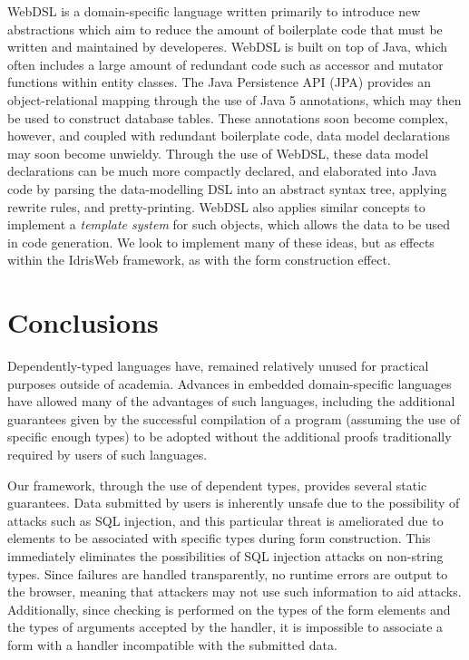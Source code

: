 \documentclass[preprint]{sigplanconf}
\begin{document}
WebDSL \cite{webdsl} is a domain-specific language written primarily to
introduce new abstractions which aim to reduce the amount of boilerplate code
that must be written and maintained by developeres. WebDSL is built on top of
Java, which often includes a large amount of redundant code such as accessor
and mutator functions within entity classes. The Java Persistence API (JPA)
\cite{jpa} provides an object-relational mapping through the use of Java 5
annotations, which may then be used to construct database tables. These
annotations soon become complex, however, and coupled with redundant
boilerplate code, data model declarations may soon become unwieldy. Through the
use of WebDSL, these data model declarations can be much more compactly
declared, and elaborated into Java code by parsing the data-modelling DSL into
an abstract syntax tree, applying rewrite rules, and pretty-printing. WebDSL
also applies similar concepts to implement a \textit{template system} for such
objects, which allows the data to be used in code generation. We look to
implement many of these ideas, but as effects within the IdrisWeb
framework, as with the form construction effect.


\section{Conclusions}
Dependently-typed languages have, remained relatively unused for practical purposes outside of academia. Advances in embedded domain-specific languages have allowed many of the advantages of such languages, including the additional guarantees given by the successful compilation of a program (assuming the use of specific enough types) to be adopted without the additional proofs traditionally required by users of such languages.

Our framework, through the use of dependent types, provides several static guarantees. Data submitted by users is inherently unsafe due to the possibility of attacks such as SQL injection, and this particular threat is ameliorated due to elements to be associated with specific types during form construction. This immediately eliminates the possibilities of SQL injection attacks on non-string types. Since failures are handled transparently, no runtime errors are output to the browser, meaning that attackers may not use such information to aid attacks. Additionally, since checking is performed on the types of the form elements and the types of arguments accepted by the handler, it is impossible to associate a form with a handler incompatible with the submitted data.
\end{document}
